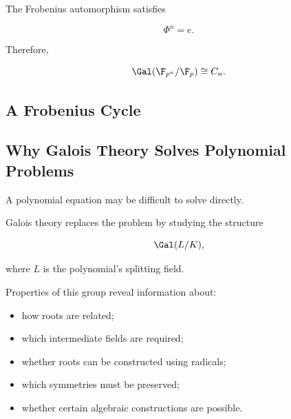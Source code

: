 The Frobenius automorphism satisfies

\[ \Phi^n=e. \]

Therefore,

\[ \Gal(\F_{p^n}/\F_p)\cong C_n. \]

\subsection{A Frobenius Cycle}
\label{subsec:frobenius-cycle-visual}

\begin{center}
\end{center}

\subsection{Why Galois Theory Solves Polynomial Problems}
\label{subsec:why-galois-polynomials}

A polynomial equation may be difficult to solve directly.

Galois theory replaces the problem by studying the structure

\[ \Gal(L/K), \]

where \(L\) is the polynomial's splitting field.

Properties of this group reveal information about:

\begin{itemize}
    \item how roots are related;
    \item which intermediate fields are required;
    \item whether roots can be constructed using radicals;
    \item which symmetries must be preserved;
    \item whether certain algebraic constructions are possible.
\end{itemize}

